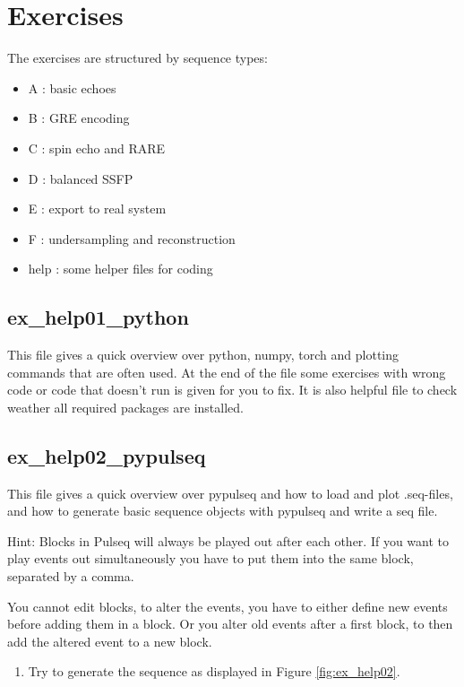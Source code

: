 \documentclass[a4paper,12pt]{extarticle}
\begin{document}
\section{Exercises}
\vspace{7.5cm}
The exercises are structured by sequence types:
\begin{itemize}
\item A : basic echoes 
\item B : GRE encoding
\item C : spin echo and RARE
\item D : balanced SSFP
\item E : export to real system
\item F : undersampling and reconstruction
\item help : some helper files for coding
\end{itemize}

\subsection{ex\_help01\_python}
This file gives a quick overview over python, numpy, torch and plotting commands that are often used.
At the end of the file some exercises with wrong code or code that doesn't run is given for you to fix.
It is also helpful file to check weather all required packages are installed. 

\subsection{ex\_help02\_pypulseq}
This file gives a quick overview over pypulseq and how to load and plot .seq-files, and how to generate basic sequence objects with pypulseq and write a seq file.

Hint: Blocks in Pulseq will always be played out after each other. If you want to play events out simultaneously you have to put them into the same block, separated by a comma.

You cannot edit blocks, to alter the events, you have to either define new events before adding them in a block. Or you alter old events after a first block, to then add the altered event to a new block.


\begin{enumerate}

\item 	Try to generate the sequence as displayed in Figure \ref{fig:ex_help02}. 

\end{enumerate}
\end{document}
